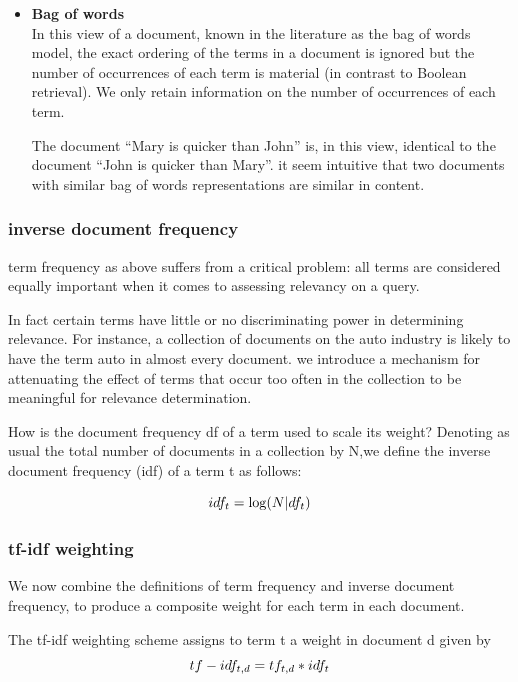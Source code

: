 \begin{itemize}
     \item \textbf{Bag of words}\\
     In this view of a document, known in the literature as the bag
     of words model, the exact ordering of the terms in a document is ignored but
     the number of occurrences of each term is material (in contrast to Boolean
     retrieval). 
     We only retain information on the number of occurrences of each term. 
    
     The document “Mary is quicker than John” is, in this view, identical to the document “John is quicker than Mary”. it seem intuitive that two documents with similar bag of words representations are
     similar in content.
\end{itemize} 

\subsubsection{inverse document frequency}

term frequency as above suffers from a critical problem: all terms are
considered equally important when it comes to assessing relevancy on a
query. 

In fact certain terms have little or no discriminating power in determining
relevance. For instance, a collection of documents on the auto
industry is likely to have the term auto in almost every document.
we introduce a mechanism for attenuating the effect of terms that occur
too often in the collection to be meaningful for relevance determination.


How is the document frequency df of a term used to scale its weight? 
Denoting as usual the total number of documents in a collection by N,we define the inverse document frequency (idf) of a term t as follows:

\begin{equation}
        \large 
            idf_{t} = \log (N | df_{t})\end{equation}

\subsubsection{tf-idf weighting}

We now combine the definitions of term frequency and inverse document
frequency, to produce a composite weight for each term in each document.

The tf-idf weighting scheme assigns to term t a weight in document d given
by
\begin{equation}
    \large
     tf-idf_{t,d} = tf_{t,d } * idf_{t} \end{equation}  
     
